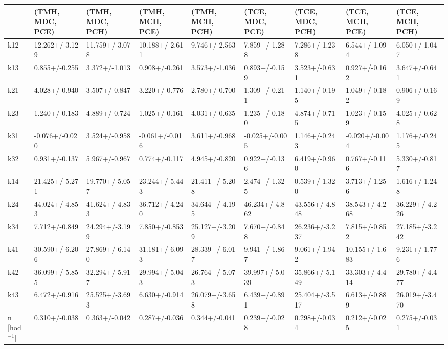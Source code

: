 \begin{tabular}{lllllllll}
\toprule
{} & (TMH, MDC, PCE) & (TMH, MDC, PCH) & (TMH, MCH, PCE) & (TMH, MCH, PCH) & (TCE, MDC, PCE) & (TCE, MDC, PCH) & (TCE, MCH, PCE) & (TCE, MCH, PCH) \\
\midrule
k12            &  12.262+/-3.129 &  11.759+/-3.078 &  10.188+/-2.611 &   9.746+/-2.563 &   7.859+/-1.288 &   7.286+/-1.238 &   6.544+/-1.094 &   6.050+/-1.047 \\
k13            &   0.855+/-0.255 &   3.372+/-1.013 &   0.908+/-0.261 &   3.573+/-1.036 &   0.893+/-0.159 &   3.523+/-0.631 &   0.927+/-0.162 &   3.647+/-0.641 \\
k21            &   4.028+/-0.940 &   3.507+/-0.847 &   3.220+/-0.776 &   2.780+/-0.700 &   1.309+/-0.211 &   1.140+/-0.195 &   1.049+/-0.182 &   0.906+/-0.169 \\
k23            &   1.240+/-0.183 &   4.889+/-0.724 &   1.025+/-0.161 &   4.031+/-0.635 &   1.235+/-0.180 &   4.874+/-0.715 &   1.023+/-0.159 &   4.025+/-0.628 \\
k31            &  -0.076+/-0.020 &   3.524+/-0.958 &  -0.061+/-0.016 &   3.611+/-0.968 &  -0.025+/-0.005 &   1.146+/-0.243 &  -0.020+/-0.004 &   1.176+/-0.245 \\
k32            &   0.931+/-0.137 &   5.967+/-0.967 &   0.774+/-0.117 &   4.945+/-0.820 &   0.922+/-0.136 &   6.419+/-0.960 &   0.767+/-0.116 &   5.330+/-0.817 \\
k14            &  21.425+/-5.271 &  19.770+/-5.057 &  23.244+/-5.443 &  21.411+/-5.208 &   2.474+/-1.325 &   0.539+/-1.320 &   3.713+/-1.256 &   1.616+/-1.248 \\
k24            &  44.024+/-4.853 &  41.624+/-4.833 &  36.712+/-4.240 &  34.644+/-4.195 &  46.234+/-4.862 &  43.556+/-4.848 &  38.543+/-4.268 &  36.229+/-4.226 \\
k34            &   7.712+/-0.849 &  24.294+/-3.199 &   7.850+/-0.853 &  25.127+/-3.209 &   7.670+/-0.848 &  26.236+/-3.237 &   7.815+/-0.852 &  27.185+/-3.242 \\
k41            &  30.590+/-6.206 &  27.869+/-6.140 &  31.181+/-6.093 &  28.339+/-6.017 &   9.941+/-1.867 &   9.061+/-1.942 &  10.155+/-1.683 &   9.231+/-1.776 \\
k42            &  36.099+/-5.855 &  32.294+/-5.917 &  29.994+/-5.043 &  26.764+/-5.073 &  39.997+/-5.039 &  35.866+/-5.149 &  33.303+/-4.414 &  29.780+/-4.477 \\
k43            &   6.472+/-0.916 &  25.525+/-3.693 &   6.630+/-0.914 &  26.079+/-3.658 &   6.439+/-0.891 &  25.404+/-3.517 &   6.613+/-0.889 &  26.019+/-3.470 \\
n [hod$^{-1}$] &   0.310+/-0.038 &   0.363+/-0.042 &   0.287+/-0.036 &   0.344+/-0.041 &   0.239+/-0.028 &   0.298+/-0.034 &   0.212+/-0.025 &   0.275+/-0.031 \\
\bottomrule
\end{tabular}
